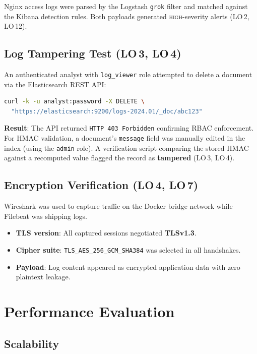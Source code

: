 \documentclass[12pt,a4paper]{report}
\begin{document}
Nginx access logs were parsed by the Logstash \texttt{grok} filter and matched
against the Kibana detection rules.
Both payloads generated \textsc{high}-severity alerts (LO\,2, LO\,12).

\subsection{Log Tampering Test (LO\,3, LO\,4)}

An authenticated analyst with \texttt{log\_viewer} role attempted to
delete a document via the Elasticsearch REST API:

\begin{lstlisting}[language=bash, caption={Unauthorized delete attempt}]
curl -k -u analyst:password -X DELETE \
  "https://elasticsearch:9200/logs-2024.01/_doc/abc123"
\end{lstlisting}

\textbf{Result}: The API returned \texttt{HTTP 403 Forbidden} confirming RBAC
enforcement.
For HMAC validation, a document's \texttt{message} field was manually edited in
the index (using the \texttt{admin} role).
A verification script comparing the stored HMAC against a recomputed value
flagged the record as \textbf{tampered} (LO\,3, LO\,4).

\subsection{Encryption Verification (LO\,4, LO\,7)}

Wireshark was used to capture traffic on the Docker bridge network while Filebeat
was shipping logs.

\begin{itemize}[leftmargin=1.5em]
    \item \textbf{TLS version}: All captured sessions negotiated \textbf{TLSv1.3}.
    \item \textbf{Cipher suite}: \texttt{TLS\_AES\_256\_GCM\_SHA384} was selected
          in all handshakes.
    \item \textbf{Payload}: Log content appeared as encrypted application data
          with zero plaintext leakage.
\end{itemize}

\section{Performance Evaluation}

\subsection{Scalability}
\end{document}
